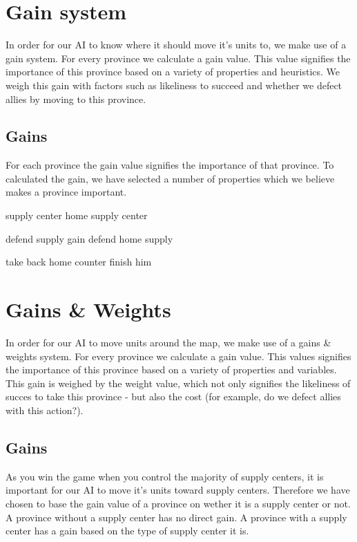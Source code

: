 \documentclass[a4paper]{article} %
\begin{document}
\section{Gain system}

In order for our AI to know where it should move it's units to, we make use of a gain system. For every province we calculate a gain value. This value signifies the importance of this province based on a variety of properties and heuristics. We weigh this gain with factors such as likeliness to succeed and whether we defect allies by moving to this province. 

\subsection{Gains}  

For each province the gain value signifies the importance of that province. To calculated the gain, we have selected a number of properties which we believe makes a province important. 

supply center
home supply center

defend supply gain
defend home supply

take back home
counter
finish him  




\section{Gains \& Weights}

In order for our AI to move units around the map, we make use of a gains \& weights system. For every province we calculate a gain value. This values signifies the importance of this province based on a variety of properties and variables. This gain is weighed by the weight value, which not only signifies the likeliness of succes to take this province - but also the cost (for example, do we defect allies with this action?).

\subsection{Gains}
As you win the game when you control the majority of supply centers, it is important for our AI to move it's units toward supply centers. Therefore we have chosen to base the gain value of a province on wether it is a supply center or not. A province without a supply center has no direct gain. A province with a supply center has a gain based on the type of supply center it is. 
\end{document}
